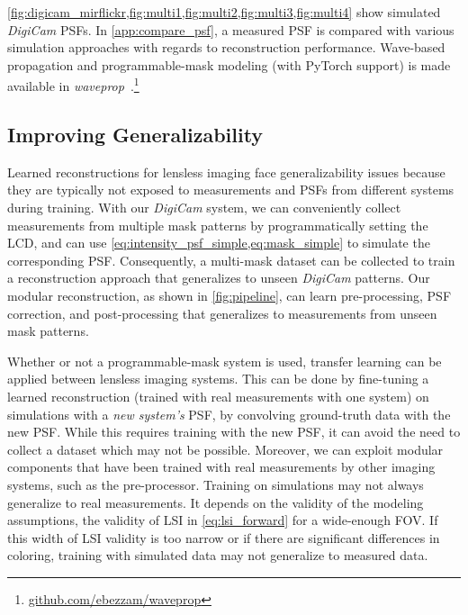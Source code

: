 \cref{fig:digicam_mirflickr,fig:multi1,fig:multi2,fig:multi3,fig:multi4} show simulated \textit{DigiCam} PSFs.
In \cref{app:compare_psf}, a measured PSF is compared with various simulation approaches with regards to reconstruction performance.
Wave-based propagation and programmable-mask modeling (with PyTorch support) is made available in \textit{waveprop}~\cite{waveprop}.\footnote{\href{https://github.com/ebezzam/waveprop}{github.com/ebezzam/waveprop}}



\subsection{Improving Generalizability}
\label{sec:improve_gen}

\noindent Learned reconstructions for lensless imaging face generalizability issues because they are typically not exposed to measurements and PSFs from different systems during training.
With our \textit{DigiCam} system, we can conveniently collect measurements from multiple mask patterns by programmatically setting the LCD, and can use \cref{eq:intensity_psf_simple,eq:mask_simple} to simulate the corresponding PSF. 
Consequently, a multi-mask dataset can be collected to train a reconstruction approach that generalizes to unseen \textit{DigiCam} patterns.
Our modular reconstruction, as shown in \cref{fig:pipeline}, can learn pre-processing, PSF correction, and post-processing that generalizes to measurements from unseen mask patterns.

Whether or not a programmable-mask system is used, transfer learning can be applied between lensless imaging systems.
This can be done by fine-tuning a learned reconstruction (trained with real measurements with one system) on simulations with a \textit{new system's} PSF, \ie by convolving ground-truth data with the new PSF.
While this requires training with the new PSF, it can avoid the need to collect a dataset which may not be possible.
Moreover, we can exploit modular components that have been trained with real measurements by other imaging systems, such as the pre-processor.
Training on simulations may not always generalize to real measurements.
It depends on the validity of the modeling assumptions, \eg the validity of LSI in \cref{eq:lsi_forward} for a wide-enough FOV.
If this width of LSI validity is too narrow or if there are significant differences in coloring, training with simulated data may not generalize to measured data.
